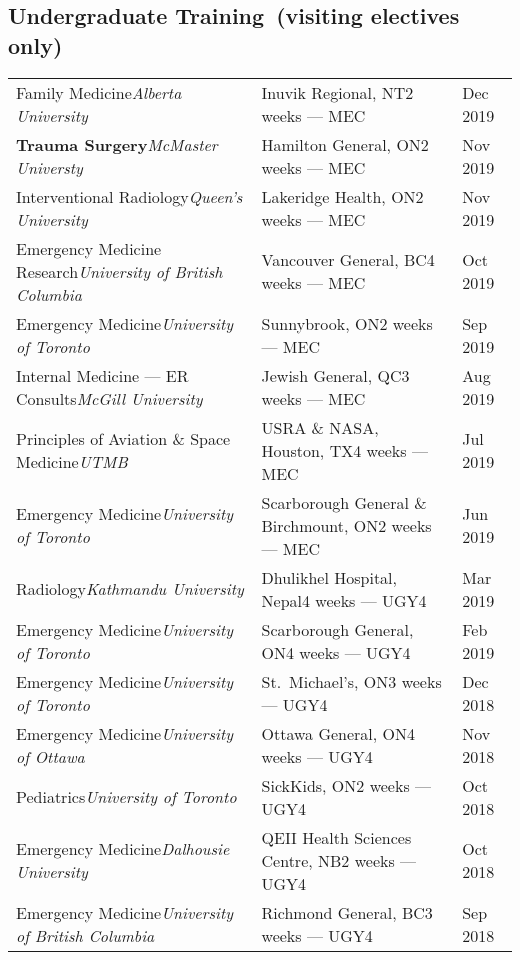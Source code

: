 \documentclass[a4paper,10pt,oneside,onecolumn,draft]{article} %
\begin{document}
\subsection*{Undergraduate Training\ {\normalfont\scriptsize (visiting electives only)}}
\begin{supertabular*}{1\textwidth}{F@{}G@{\SubVRule}H}
  {Family Medicine}\hfill{\slshape Alberta University\/}&{Inuvik Regional, NT}\hfill{2 weeks --- MEC}&Dec 2019\\
  {\bfseries Trauma Surgery}\hfill{\slshape McMaster Universty\/}&{Hamilton General, ON}\hfill{2 weeks --- MEC}&Nov 2019\\
  {Interventional Radiology}\hfill{\slshape Queen’s University\/}&{Lakeridge Health, ON}\hfill{2 weeks --- MEC}&Nov 2019\\
  {Emergency Medicine Research}\hfill{\slshape University of British Columbia\/}&{Vancouver General, BC}\hfill{4 weeks --- MEC}&Oct 2019\\
  {Emergency Medicine}\hfill{\slshape University of Toronto\/}&{Sunnybrook, ON}\hfill{2 weeks --- MEC}&Sep 2019\\
  {Internal Medicine --- ER Consults}\hfill{\slshape McGill University\/}&{Jewish General, QC}\hfill{3 weeks --- MEC}&Aug 2019\\
  {Principles of Aviation \& Space Medicine}\hfill{\slshape UTMB\/}&{USRA \& NASA, Houston, TX}\hfill{4 weeks --- MEC}&Jul 2019\\
  {Emergency Medicine}\hfill{\slshape University of Toronto\/}&{Scarborough General \& Birchmount, ON}\hfill{2 weeks --- MEC}&Jun 2019\\
  {Radiology}\hfill{\slshape Kathmandu University\/}&{Dhulikhel Hospital, Nepal}\hfill{4 weeks --- UGY4}&Mar 2019\\
  {Emergency Medicine}\hfill{\slshape University of Toronto\/}&{Scarborough General, ON}\hfill{4 weeks --- UGY4}&Feb 2019\\
  {Emergency Medicine}\hfill{\slshape University of Toronto\/}&{St.\ Michael’s, ON}\hfill{3 weeks --- UGY4}&Dec 2018\\
  {Emergency Medicine}\hfill{\slshape University of Ottawa\/}&{Ottawa General, ON}\hfill{4 weeks --- UGY4}&Nov 2018\\
  {Pediatrics}\hfill{\slshape University of Toronto\/}&{SickKids, ON}\hfill{2 weeks --- UGY4}&Oct 2018\\
  {Emergency Medicine}\hfill{\slshape Dalhousie University\/}&{QEII Health Sciences Centre, NB}\hfill{2 weeks --- UGY4}&Oct 2018\\
  {Emergency Medicine}\hfill{\slshape University of British Columbia\/}&{Richmond General, BC}\hfill{3 weeks --- UGY4}&Sep 2018\\
\end{supertabular*}
\end{document}
